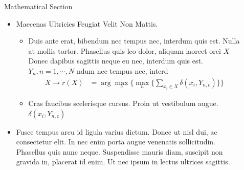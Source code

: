\documentclass[final,hyperref={pdfpagelabels=false}]{beamer}
\begin{document}
\begin{frame}[t]
\begin{columns}[t]
\begin{column}{.465\textwidth}
            \begin{block}{Mathematical Section}

                \begin{itemize}
                    \item Maecenas Ultricies Feugiat Velit Non Mattis.
                          \begin{itemize}
                              \item Duis ante erat, bibendum nec tempus nec, interdum quis est. Nulla at mollis tortor. Phasellus quis leo dolor, aliquam laoreet orci $X$ Donec dapibus sagittis neque eu nec, interdum quis est. $Y_n, n=1,\cdots,N$ ndum nec tempus nec, interd
                                    \begin{align*}
                                        X \rightarrow r(X) & = \arg \max_{c} \Big\{ \max_n \big\{ \sum_{x_i \in X} \delta(x_i,Y_{n,c})\big\} \Big\}
                                    \end{align*}
                              \item Cras faucibus scelerisque cursus. Proin ut vestibulum augue. $\delta(x_i,Y_{n,c})$
                          \end{itemize}
                    \item Fusce tempus arcu id ligula varius dictum. Donec ut nisl dui, ac consectetur elit. In nec enim porta augue venenatis sollicitudin. Phasellus quis nunc neque. Suspendisse mauris diam, suscipit non gravida in, placerat id enim. Ut nec ipsum in lectus ultrices sagittis.
                \end{itemize}

            \end{block}


        \end{column} %

        \begin{column}{.03\textwidth}\end{column} %

        \begin{column}{.465\textwidth} %



\end{column}
\end{columns}
\end{frame}
\end{document}
